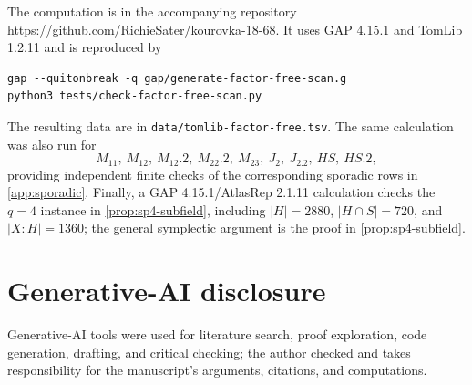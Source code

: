 \documentclass[11pt]{amsart}
\theoremstyle{definition}
\begin{document}
The computation is in the accompanying repository
\url{https://github.com/RichieSater/kourovka-18-68}.  It uses GAP 4.15.1
and TomLib 1.2.11 and is reproduced by
\begin{verbatim}
gap --quitonbreak -q gap/generate-factor-free-scan.g
python3 tests/check-factor-free-scan.py
\end{verbatim}
The resulting data are in \texttt{data/tomlib-factor-free.tsv}.  The same
calculation was also run for
\[
 M_{11},\ M_{12},\ M_{12}.2,\ M_{22}.2,\ M_{23},\
 J_2,\ J_2.2,\ HS,\ HS.2,
\]
providing independent finite checks of the corresponding sporadic rows in
\cref{app:sporadic}.  Finally, a GAP 4.15.1/AtlasRep 2.1.11 calculation
checks the \(q=4\) instance in \cref{prop:sp4-subfield}, including
\(\lvert H\rvert=2880\), \(\lvert H\cap S\rvert=720\), and
\(\lvert X:H\rvert=1360\); the general symplectic argument is the proof in
\cref{prop:sp4-subfield}.


\section*{Generative-AI disclosure}
Generative-AI tools were used for literature search, proof exploration, code
generation, drafting, and critical checking; the author checked and takes
responsibility for the manuscript's arguments, citations, and computations.
\end{document}
